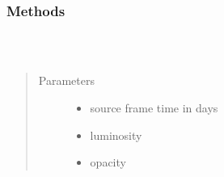 \documentclass[letterpaper,10pt,english]{sphinxmanual}
\begin{document}
\begin{fulllineitems}
\label{\detokenize{generated/sdapy.interaction_processes.AsphericalDiffusion:sdapy.interaction_processes.AsphericalDiffusion}}~\subsubsection*{Methods}


\begin{savenotes}\sphinxattablestart
\centering
\begin{tabulary}{\linewidth}[t]{|T|T|}
\hline

&\\
\hline
\end{tabulary}
\par
\sphinxattableend\end{savenotes}

\begin{fulllineitems}
\label{\detokenize{generated/sdapy.interaction_processes.AsphericalDiffusion:sdapy.interaction_processes.AsphericalDiffusion.__init__}}~\begin{quote}\begin{description}
\item[{Parameters}] \leavevmode\begin{itemize}
\item {} 
 \textendash{} source frame time in days

\item {} 
 \textendash{} luminosity

\item {} 
 \textendash{} opacity


\end{itemize}
\end{description}
\end{quote}
\end{fulllineitems}
\end{fulllineitems}
\end{document}
